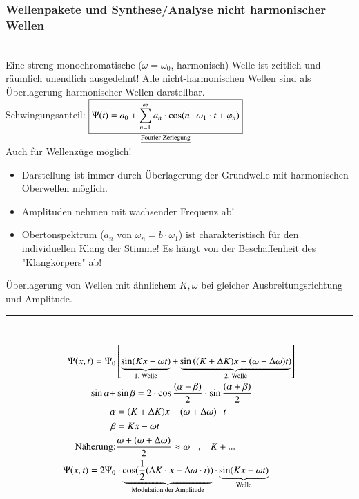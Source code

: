  \subsubsection{Wellenpakete und Synthese/Analyse nicht harmonischer Wellen} \hfill \\
 Eine streng monochromatische ($ \omega=\omega_0 $, harmonisch) Welle ist zeitlich und räumlich unendlich ausgedehnt! Alle nicht-harmonischen Wellen sind als Überlagerung harmonischer Wellen darstellbar. \\
 Schwingungsanteil: $ \underset{\text{\underline{Fourier-Zerlegung}}}{\boxed{\Psi(t) = a_0 + \sum_{n=1}^{\infty} a_n \cdot \cos(n\cdot\omega_1\cdot t + \varphi_n)}} $ \\
 Auch für Wellenzüge möglich!
 \bild
 \bild
 \bild
 \begin{itemize}
 	\item Darstellung ist immer durch Überlagerung der Grundwelle mit harmonischen Oberwellen möglich.
 	\item Amplituden nehmen mit wachsender Frequenz ab!
 	\item Obertonspektrum ($ a_n $ von $ \omega_n = b\cdot \omega_1 $) ist charakteristisch für den individuellen Klang der Stimme! Es hängt von der Beschaffenheit des "Klangkörpers" ab!
 \end{itemize}
 Überlagerung von Wellen mit ähnlichem $ K,\omega $ bei gleicher Ausbreitungsrichtung und Amplitude.\\
 \rule{5cm}{.2pt}\\
 \bild
 \begin{align*}
 	\Psi(x,t) = \Psi_0 &\left[ \underbrace{\sin(Kx-\omega t) }_{\text{1. Welle}}+ \underbrace{\sin\left( (K+\Delta K)x-(\omega+\Delta\omega)t\right) }_{\text{2. Welle}} \right]\\
 	\sin\alpha+&\sin\beta = 2\cdot\cos\frac{(\alpha-\beta)}{2} \cdot \sin\frac{(\alpha+\beta)}{2}\\
 	\alpha &=(K+\Delta K)x-(\omega+\Delta\omega) \cdot t\\
 	\beta &= Kx-\omega t\\
 	\text{Näherung:}& \frac{\omega + (\omega + \Delta\omega)}{2} \approx \omega \hspace{3mm} ,\hspace{3mm} K+...\\
 	\Psi(x,t) = 2 \Psi_0 & \cdot \underbrace{\cos(\frac{1}{2}(\Delta K \cdot x - \Delta\omega\cdot t) )}_{\text{Modulation der Amplitude}} \cdot \underbrace{\sin(Kx-\omega t)}_{\text{Welle}}
 \end{align*}
 \bild
